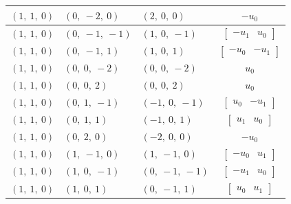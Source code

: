\documentclass[11pt]{article}
\theoremstyle{definition}
\begin{document}
\begin{longtable}{|l|l|l|c|}
    \hline
    $\left( 1, \  1, \  0\right)$ & $\left( 0, \  -2, \  0\right)$ & $\left( 2, \  0, \  0\right)$ & $- u_{0}$ \\
    \hline
    $\left( 1, \  1, \  0\right)$ & $\left( 0, \  -1, \  -1\right)$ & $\left( 1, \  0, \  -1\right)$ & $\left[\begin{matrix}- u_{1} & u_{0}\end{matrix}\right]$ \\
    \hline
    $\left( 1, \  1, \  0\right)$ & $\left( 0, \  -1, \  1\right)$ & $\left( 1, \  0, \  1\right)$ & $\left[\begin{matrix}- u_{0} & - u_{1}\end{matrix}\right]$ \\
    \hline
    $\left( 1, \  1, \  0\right)$ & $\left( 0, \  0, \  -2\right)$ & $\left( 0, \  0, \  -2\right)$ & $u_{0}$ \\
    \hline
    $\left( 1, \  1, \  0\right)$ & $\left( 0, \  0, \  2\right)$ & $\left( 0, \  0, \  2\right)$ & $u_{0}$ \\
    \hline
    $\left( 1, \  1, \  0\right)$ & $\left( 0, \  1, \  -1\right)$ & $\left( -1, \  0, \  -1\right)$ & $\left[\begin{matrix}u_{0} & - u_{1}\end{matrix}\right]$ \\
    \hline
    $\left( 1, \  1, \  0\right)$ & $\left( 0, \  1, \  1\right)$ & $\left( -1, \  0, \  1\right)$ & $\left[\begin{matrix}u_{1} & u_{0}\end{matrix}\right]$ \\
    \hline
    $\left( 1, \  1, \  0\right)$ & $\left( 0, \  2, \  0\right)$ & $\left( -2, \  0, \  0\right)$ & $- u_{0}$ \\
    \hline
    $\left( 1, \  1, \  0\right)$ & $\left( 1, \  -1, \  0\right)$ & $\left( 1, \  -1, \  0\right)$ & $\left[\begin{matrix}- u_{0} & u_{1}\end{matrix}\right]$ \\
    \hline
    $\left( 1, \  1, \  0\right)$ & $\left( 1, \  0, \  -1\right)$ & $\left( 0, \  -1, \  -1\right)$ & $\left[\begin{matrix}- u_{1} & u_{0}\end{matrix}\right]$ \\
    \hline
    $\left( 1, \  1, \  0\right)$ & $\left( 1, \  0, \  1\right)$ & $\left( 0, \  -1, \  1\right)$ & $\left[\begin{matrix}u_{0} & u_{1}\end{matrix}\right]$ \\

\end{longtable}
\end{document}

